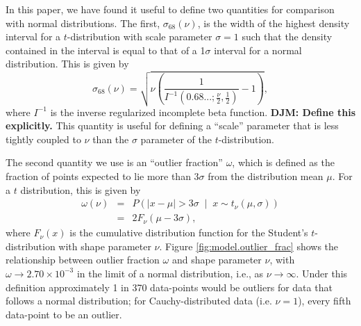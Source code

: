 \documentclass[fleqn,usenatbib]{rasti}
\newcommand{\studentt}[2]{t_\nu \left( #1, #2 \right)}
\begin{document}
In this paper, we have found it useful to define two quantities for comparison
with normal distributions. The first, $\sigma_{68}(\nu)$, is the width of the
highest density interval for a $t$-distribution with scale parameter
$\sigma = 1$ such that the density contained in the interval is equal to that
of a 1$\sigma$ interval for a normal distribution. This is given by
\begin{equation}
    \sigma_{68}(\nu) = \sqrt{\nu \left(\frac{1}{I^{-1}(0.68...;\frac\nu2, \frac12)} - 1\right)},
\end{equation}
where $I^{-1}$ is the inverse regularized incomplete beta function.
{\bf DJM: Define this explicitly.}
This
quantity is useful for defining a ``scale'' parameter that is less tightly
coupled to $\nu$ than the $\sigma$ parameter of the $t$-distribution.

The second quantity we use is an ``outlier fraction'' $\omega$, which
is defined as the fraction of points expected to lie more than $3\sigma$ from the
distribution mean $\mu$. For a $t$ distribution, this is given by
\begin{eqnarray}
    \omega(\nu)
    &=& P\left(
        \left|x - \mu \right| > 3 \sigma \;
        \middle| \;
        x \sim \studentt{\mu}{\sigma}
    \right) \\
    &=& 2 F_\nu \left(\mu - 3 \sigma \right),
\end{eqnarray}
where $F_\nu(x)$ is the cumulative distribution function for the Student's
$t$-distribution with shape parameter $\nu$. Figure \ref{fig:model.outlier_frac}
shows the relationship between outlier fraction $\omega$ and shape parameter
$\nu$, with $\omega \rightarrow 2.70 \times 10^{-3} $ in the limit of a normal
distribution, i.e., as $\nu \rightarrow \infty$.  Under this definition
approximately 1 in 370 data-points would be outliers for data that follows a
normal distribution; for Cauchy-distributed data (i.e. $\nu = 1$), every fifth
data-point to be an outlier.
\end{document}
